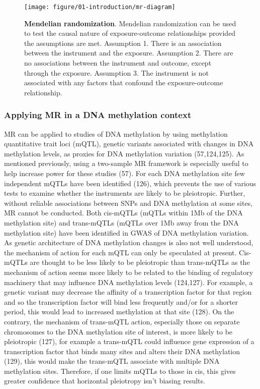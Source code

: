 \documentclass[11pt,oneside]{bristolthesis}
\begin{document}
\begin{figure}

{\centering \texttt{[image: figure/01-introduction/mr-diagram]} 

}

\caption[Mendelian randomization]{\textbf{Mendelian randomization}. Mendelian randomization can be used to test the causal nature of exposure-outcome relationships provided the assumptions are met. Assumption 1. There is an association between the instrument and the exposure. Assumption 2. There are no associations between the instrument and outcome, except through the exposure. Assumption 3. The instrument is not associated with any factors that confound the exposure-outcome relationship.}\label{fig:mr-diagram}
\end{figure}
\hypertarget{applying-mr-in-a-dna-methylation-context}{%
\subsubsection{Applying MR in a DNA methylation context}\label{applying-mr-in-a-dna-methylation-context}}

MR can be applied to studies of DNA methylation by using methylation quantitative trait loci (mQTL), genetic variants associated with changes in DNA methylation levels, as proxies for DNA methylation variation (57,124,125). As mentioned previously, using a two-sample MR framework is especially useful to help increase power for these studies (57). For each DNA methylation site few independent mQTLs have been identified (126), which prevents the use of various tests to examine whether the instruments are likely to be pleiotropic. Further, without reliable associations between SNPs and DNA methylation at some sites, MR cannot be conducted. Both cis-mQTLs (mQTLs within 1Mb of the DNA methylation site) and trans-mQTLs (mQTLs over 1Mb away from the DNA methylation site) have been identified in GWAS of DNA methylation variation. As genetic architecture of DNA methylation changes is also not well understood, the mechanism of action for each mQTL can only be speculated at present. Cis-mQTLs are thought to be less likely to be pleiotropic than trans-mQTLs as the mechanism of action seems more likely to be related to the binding of regulatory machinery that may influence DNA methylation levels (124,127). For example, a genetic variant may decrease the affinity of a transcription factor for that region and so the transcription factor will bind less frequently and/or for a shorter period, this would lead to increased methylation at that site (128). On the contrary, the mechanism of trans-mQTL action, especially those on separate chromosomes to the DNA methylation site of interest, is more likely to be pleiotropic (127), for example a trans-mQTL could influence gene expression of a transcription factor that binds many sites and alters their DNA methylation (129), this would make the trans-mQTL associate with multiple DNA methylation sites. Therefore, if one limits mQTLs to those in cis, this gives greater confidence that horizontal pleiotropy isn't biasing results.
\end{document}
